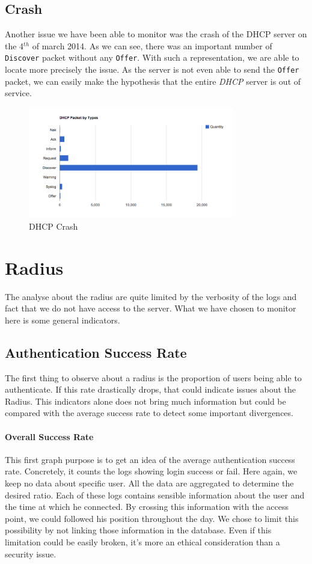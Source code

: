 \subsection{Crash}
Another issue we have been able to monitor was the crash of the DHCP server on the 4$^{th}$ of march 2014. As we can see, there was an important number of \texttt{Discover} packet without any \texttt{Offer}. With such a representation, we are able to locate more precisely the issue. As the server is not even able to send the \texttt{Offer} packet, we can easily make the hypothesis that the entire \emph{DHCP} server is out of service.

\begin{figure}[H]
	\centering
   \includegraphics[width=0.8\textwidth]{Pictures/chapter5/dhcpCrash.png}
   \caption{DHCP Crash}
\end{figure}

\section{Radius}
The analyse about the radius are quite limited by the verbosity of the logs and fact that we do not have access to the server. What we have chosen to monitor here is some general indicators.

\subsection{Authentication Success Rate}
The first thing to observe about a radius is the proportion of users being able to authenticate. If this rate drastically drops, that could indicate issues about the Radius. This indicators alone does not bring much information but could be compared with the average success rate to detect some important divergences.

\paragraph*{Overall Success Rate} This first graph purpose is to get an idea of the average authentication success rate. Concretely, it counts the logs showing login success or fail. Here again, we keep no data about specific user. All the data are aggregated to determine the desired ratio. Each of these logs contains sensible information about the user and the time at which he connected. By crossing this information with the access point, we could followed his position throughout the day. We chose to limit this possibility by not linking those information in the database. Even if this limitation could be easily broken, it's more an ethical consideration than a security issue.

